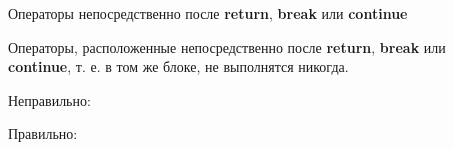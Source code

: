 \begin{typerror}
	Операторы непосредственно после \textbf{return}, \textbf{break} или \textbf{continue}

	Операторы, расположенные непосредственно после \textbf{return}, \textbf{break} или \textbf{continue}, т. е. в том же блоке, не выполнятся никогда.

	Неправильно:

	Правильно:

\end  {typerror}
